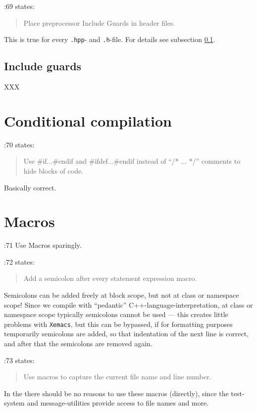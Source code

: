 \documentclass{book}
\begin{document}
\cite{OKL_MisfeldtBumgardnerGray2004CppStyle}:69 states:
\begin{quote}
  Place preprocessor Include Guards in header files.
\end{quote}
This is true for every \texttt{.hpp}- and \texttt{.h}-file. For details see subsection \ref{sec:includeguards}.


\subsection{Include guards}
\label{sec:includeguards}

XXX


\section{Conditional compilation}
\label{sec:PreprocessorConditional}

\cite{OKL_MisfeldtBumgardnerGray2004CppStyle}:70 states:
\begin{quote}
  Use {\#}if...{\#}endif and {\#}ifdef...{\#}endif instead of ``/* ... */'' comments to hide blocks of code.
\end{quote}
Basically correct.


\section{Macros}
\label{sec:PreprocessorMacros}

\cite{OKL_MisfeldtBumgardnerGray2004CppStyle}:71 Use Macros sparingly.

\cite{OKL_MisfeldtBumgardnerGray2004CppStyle}:72 states:
\begin{quote}
  Add a semicolon after every statement expression macro.
\end{quote}
Semicolons can be added freely at block scope, but not at class or namespace scope! Since we compile with ``pedantic'' C++-language-interpretation, at class or namespace scope typically semicolons cannot be used --- this creates little problems with \texttt{Xemacs}, but this can be bypassed, if for formatting purposes temporarily semicolons are added, so that indentation of the next line is correct, and after that the semicolons are removed again.

\cite{OKL_MisfeldtBumgardnerGray2004CppStyle}:73 states:
\begin{quote}
  Use macros to capture the current file name and line number.
\end{quote}
In the \OKlibrary{} there should be no reasons to use these macros (directly), since the test-system and message-utilities provide access to file names and more.
\end{document}
